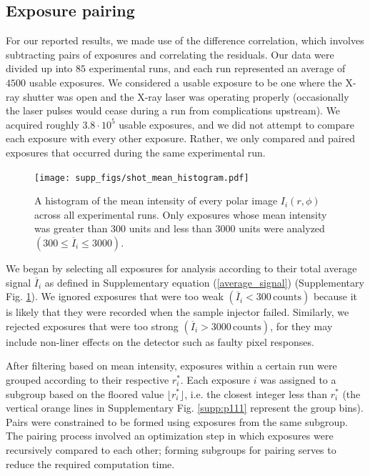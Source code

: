 \documentclass [12pt,fleqn]{article}
\begin{document}
\subsection{Exposure pairing} \label{pairing}
For our reported results, we made use of the difference correlation, which involves subtracting pairs of exposures and correlating the residuals. Our data were divided up into $85$ experimental  runs, and each run represented an average of $4500$ usable exposures. We considered a usable exposure to be one where the X-ray shutter was open and the X-ray laser was operating properly (occasionally the laser pulses would cease during a run from complications upstream). We acquired roughly $3.8 \cdot 10^5$ usable exposures, and we did not attempt to compare each exposure with every other exposure. Rather, we only compared and paired exposures that occurred during the same experimental run.

\begin{figure}[H]
\texttt{[image: supp\_figs/shot\_mean\_histogram.pdf]}
\caption{A histogram of the mean intensity of every polar image $I_i(r,\phi)$ across all experimental runs. Only exposures whose mean intensity was greater than 300 units and less than 3000 units were analyzed $(300 \le \overline I_i \le 3000)$.}
\label{fig:shot_mean_histogram}
\end{figure}
We began by selecting all exposures for analysis according to their total average signal $\overline I_i$ as defined in Supplementary equation (\ref{average_signal}) (Supplementary Fig. \ref{fig:shot_mean_histogram}). We ignored exposures that were too weak $(\overline I_i < 300 \mathrm{\,counts})$ because it is likely that they were recorded when the sample injector failed. Similarly, we rejected exposures that were too strong $(\overline I_i > 3000 \mathrm{\,counts})$, for they may include non-liner effects on the detector such as faulty pixel responses.

After filtering based on mean intensity, exposures within a certain run were grouped according to their respective $r^*_i$. Each exposure $i$ was assigned to a subgroup based on the floored value $\lfloor r^*_i \rfloor$, i.e. the closest integer less than $r^*_i$ (the vertical orange lines in Supplementary Fig. \ref{supp:p111} represent the group bins). Pairs were constrained to be formed using exposures from the same subgroup. The pairing process involved an optimization step in which exposures were recursively compared to each other; forming subgroups for pairing serves to reduce the required computation time. 
\end{document}
